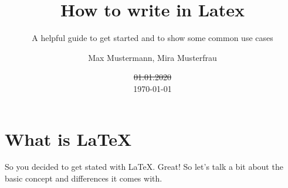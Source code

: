\documentclass[	%
		fontsize=11pt,  %
		a4paper,	    %
		english,		%
		sans,			%
		f1,				%
	]{HsH-report}		%
\author{
	Max Mustermann,
	Mira Musterfrau
} %
\title{How to write in Latex}
\subtitle{A helpful guide to get started and to show some common use cases}
\date{\st{01.01.2020}\\\today}
\begin{document}

\frontmatter

\maketitle[c]

\declarationAuthorship

\begin{abstract}
	\lipsum[5-6]
\end{abstract}

\tableofcontents

\mainmatter


\chapter{What is LaTeX} \label{chap: latex}
	So you decided to get stated with LaTeX. Great! So let's talk a bit about the basic concept and differences it comes with.
\end{document}

